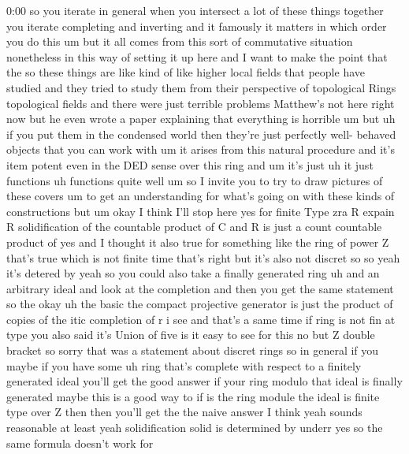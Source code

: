 \begin{unfinished}{0:00}
so  you  iterate  in  general  when  you
intersect  a  lot  of  these  things  together
you  iterate  completing  and
inverting  and  it  famously  it  matters  in
which  order  you  do
this  um  but  it  all  comes  from  this  sort
of  commutative  situation  nonetheless  in
this  way  of  setting  it  up  here  and  I
want  to  make  the  point  that  the  so  these
things  are  like  kind  of  like  higher
local  fields  that  people  have  studied
and  they  tried  to  study  them  from  their
perspective  of  topological  Rings
topological  fields  and  there  were  just
terrible  problems  Matthew's  not  here
right  now  but  he  even  wrote  a  paper
explaining  that  everything  is  horrible
um  but  uh  if  you  put  them  in  the
condensed  world  then  they're  just
perfectly  well-  behaved  objects  that  you
can  work  with  um  it  arises  from  this
natural  procedure  and  it's  item  potent
even  in  the  DED  sense  over  this  ring  and
um
it's  just  uh  it  just  functions  uh
functions  quite
well  um  so  I  invite  you  to  try  to  draw
pictures  of  these  covers  um  to  get  an
understanding  for  what's  going  on  with
these  kinds  of  constructions  but  um  okay
I  think  I'll  stop
here
yes  for  finite  Type  zra  R
expain  R  solidification  of  the  countable
product  of  C  and  R  is  just  a  count
countable  product  of  yes  and  I  thought
it  also  true  for  something
like  the  ring  of  power  Z  that's  true
which  is  not  finite  time  that's  right
but  it's  also  not  discret  so  so  yeah
it's  detered  by  yeah  so  you  could  also
take  a  finally  generated
ring  uh  and  an  arbitrary  ideal  and  look
at  the  completion  and  then  you  get  the
same  statement  so  the  okay  uh  the  basic
the  compact  projective  generator  is  just
the  product  of  copies  of  the  itic
completion  of
r  i  see  and  that's  a  same  time  if  ring
is  not  fin  at  type  you  also  said  it's
Union  of  five
is  it  easy  to  see  for
this  no  but  Z  double  bracket  so  sorry
that  was  a  statement  about  discret
rings  so  in  general  if  you  maybe  if  you
have  some  uh  ring  that's  complete  with
respect  to  a  finitely  generated  ideal
you'll  get  the  good  answer  if  your  ring
modulo  that  ideal  is  finally  generated
maybe  this  is  a  good  way  to
if  is  the  ring  module  the  ideal  is
finite  type  over  Z  then  then  you'll  get
the  the  naive
answer  I  think  yeah  sounds  reasonable  at
least
yeah  solidification  solid  is  determined
by
underr
yes  so  the  same  formula  doesn't  work  for

\end{unfinished}
